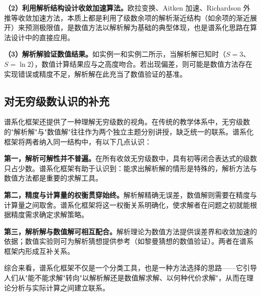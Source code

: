 \textbf{（2）利用解析结构设计收敛加速算法。}欧拉变换、Aitken 加速、Richardson 外推等收敛加速方法，本质上都是利用了级数余项的解析渐近结构（如余项的渐近展开）来预测极限值，是数值方法以解析解为基础的典型体现，也是谱系化思路在算法设计中的直接应用。

\textbf{（3）解析解验证数值结果。}如实例一和实例二所示，当解析解已知时（$S=3$、$S=\ln 2$），数值计算结果应与之高度吻合。若出现偏差，则可能是数值方法存在实现错误或精度不足，解析解在此充当了数值验证的基准。

\subsection{对无穷级数认识的补充
}

谱系化框架还提供了一种理解无穷级数的视角。在传统的教学体系中，无穷级数的"解析解"与"数值解"往往作为两个独立主题分别讲授，缺乏统一的联系。谱系化框架将两者纳入同一结构中，有以下几点认识：

\textbf{第一，解析可解性并不普遍。}在所有收敛无穷级数中，具有初等闭合表达式的级数只占少数。谱系化框架有助于认识到：能求出解析解的情形是特殊的，解析方法与数值方法都是重要的求解工具。

\textbf{第二，精度与计算量的权衡贯穿始终。}解析解精确无误差，数值解则需要在精度与计算量之间取舍。谱系化框架将这一权衡关系明确化，使求解者在问题之初就能根据精度需求确定求解策略。

\textbf{第三，解析解与数值解可相互配合。}解析理论为数值方法提供误差界和收敛加速的依据；数值实验则可为解析猜想提供参考（如黎曼猜想的数值验证）。两者在谱系框架内形成互补关系。

综合来看，谱系化框架不仅是一个分类工具，也是一种方法选择的思路——它引导人们从"能不能求解"转向"以解析解还是数值解求解、以何种代价求解"，从而在理论分析与实际计算之间建立联系。
